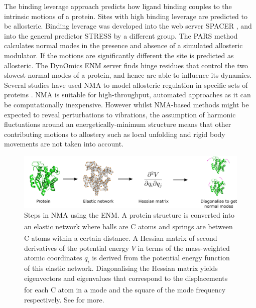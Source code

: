 The binding leverage approach \cite{Mitternacht2011} predicts how ligand binding couples to the intrinsic motions of a protein.
Sites with high binding leverage are predicted to be allosteric.
Binding leverage was developed into the web server SPACER \cite{Goncearenco2013}, and into the general predictor STRESS \cite{Clarke2016} by a different group.
The PARS method \cite{Panjkovich2012, Panjkovich2014} calculates normal modes in the presence and absence of a simulated allosteric modulator.
If the motions are significantly different the site is predicted as allosteric.
The DynOmics ENM server \cite{Li2017} finds hinge residues that control the two slowest normal modes of a protein, and hence are able to influence its dynamics.
Several studies have used NMA to model allosteric regulation in specific sets of proteins \cite{Balabin2009, Rodgers2013, Zheng2007, Su2014}.
NMA is suitable for high-throughput, automated approaches as it can be computationally inexpensive.
However whilst NMA-based methods might be expected to reveal perturbations to vibrations, the assumption of harmonic fluctuations around an energetically-minimum structure means that other contributing motions to allostery such as local unfolding and rigid body movements \cite{Motlagh2014} are not taken into account.


\begin{figure}
\centering

\includegraphics[width=\textwidth]{figures/nma/nma}

\caption[Steps in normal mode analysis]
{Steps in NMA using the ENM.
A protein structure is converted into an elastic network where balls are C\textsuperscript{\textalpha} atoms and springs are between C\textsuperscript{\textalpha} atoms within a certain distance.
A Hessian matrix of second derivatives of the potential energy $V$ in terms of the mass-weighted atomic coordinates $q_{i}$ is derived from the potential energy function of this elastic network.
Diagonalising the Hessian matrix yields eigenvectors and eigenvalues that correspond to the displacements for each C\textsuperscript{\textalpha} atom in a mode and the square of the mode frequency respectively.
See \cite{Hayward2008} for more.}

\label{fig:nma}
\end{figure}


